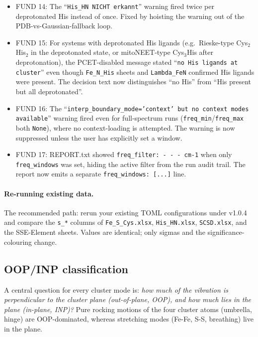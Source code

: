 \documentclass[11pt,a4paper,twoside]{article}
\newcommand{\OOP}{\mathrm{OOP}}
\theoremstyle{remark}
\begin{document}
\begin{itemize}\setlength{\itemsep}{2pt}
  \item FUND 14: The
        ``\texttt{His\_HN NICHT erkannt}'' warning fired twice per
        deprotonated His instead of once. Fixed by hoisting the
        warning out of the PDB-vs-Gaussian-fallback loop.
  \item FUND 15: For systems with deprotonated His ligands
        (e.g.\ Rieske-type Cys$_2$His$_2$ in the deprotonated
        state, or mitoNEET-type Cys$_3$His after deprotonation),
        the PCET-disabled message stated ``\texttt{no His ligands
        at cluster}'' even though \texttt{Fe\_N\_His} sheets and
        \texttt{Lambda\_FeN} confirmed His ligands were present.
        The decision text now distinguishes ``no His'' from
        ``His present but all deprotonated''.
  \item FUND 16: The
        ``\texttt{interp\_boundary\_mode='context' but no context
        modes available}'' warning fired even for full-spectrum
        runs (\texttt{freq\_min}/\texttt{freq\_max} both
        \texttt{None}), where no context-loading is attempted. The
        warning is now suppressed unless the user has explicitly
        set a window.
  \item FUND 17: REPORT.txt showed \texttt{freq\_filter: - - -
        cm-1} when only \texttt{freq\_windows} was set, hiding
        the active filter from the run audit trail. The report now
        emits a separate \texttt{freq\_windows: [...]} line.
\end{itemize}

\paragraph{Re-running existing data.} The recommended path: rerun
your existing TOML configurations under v1.0.4 and compare the
\texttt{s\_*} columns of \texttt{Fe\_S\_Cys.xlsx},
\texttt{His\_HN.xlsx}, \texttt{SCSD.xlsx}, and the SSE-Element
sheets. Values are identical; only sigmas and the
significance-colouring change.

\subsection{OOP/INP classification}
\label{sec:oop-inp}

A central question for every cluster mode is: \emph{how much of the
vibration is perpendicular to the cluster plane (out-of-plane, OOP),
and how much lies in the plane (in-plane, INP)?}
Pure rocking motions of the four cluster atoms (umbrella, hinge) are
$\OOP$-dominated, whereas stretching modes (Fe-Fe, S-S, breathing)
live in the plane.
\end{document}
